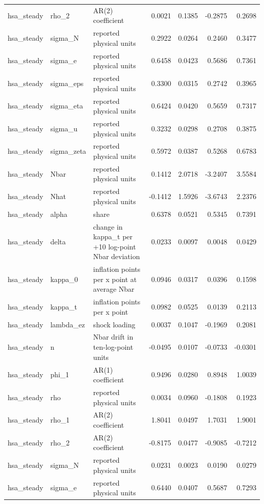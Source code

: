 \begin{tabular}{lllrrrr}
hsa\_steady & rho\_2 & AR(2) coefficient & 0.0021 & 0.1385 & -0.2875 & 0.2698 \\
hsa\_steady & sigma\_N & reported physical units & 0.2922 & 0.0264 & 0.2460 & 0.3477 \\
hsa\_steady & sigma\_e & reported physical units & 0.6458 & 0.0423 & 0.5686 & 0.7361 \\
hsa\_steady & sigma\_eps & reported physical units & 0.3300 & 0.0315 & 0.2742 & 0.3965 \\
hsa\_steady & sigma\_eta & reported physical units & 0.6424 & 0.0420 & 0.5659 & 0.7317 \\
hsa\_steady & sigma\_u & reported physical units & 0.3232 & 0.0298 & 0.2708 & 0.3875 \\
hsa\_steady & sigma\_zeta & reported physical units & 0.5972 & 0.0387 & 0.5268 & 0.6783 \\
hsa\_steady & Nbar & reported physical units & 0.1412 & 2.0718 & -3.2407 & 3.5584 \\
hsa\_steady & Nhat & reported physical units & -0.1412 & 1.5926 & -3.6743 & 2.2376 \\
hsa\_steady & alpha & share & 0.6378 & 0.0521 & 0.5345 & 0.7391 \\
hsa\_steady & delta & change in kappa\_t per +10 log-point Nbar deviation & 0.0233 & 0.0097 & 0.0048 & 0.0429 \\
hsa\_steady & kappa\_0 & inflation points per x point at average Nbar & 0.0946 & 0.0317 & 0.0396 & 0.1598 \\
hsa\_steady & kappa\_t & inflation points per x point & 0.0982 & 0.0525 & 0.0139 & 0.2113 \\
hsa\_steady & lambda\_ez & shock loading & 0.0037 & 0.1047 & -0.1969 & 0.2081 \\
hsa\_steady & n & Nbar drift in ten-log-point units & -0.0495 & 0.0107 & -0.0733 & -0.0301 \\
hsa\_steady & phi\_1 & AR(1) coefficient & 0.9496 & 0.0280 & 0.8948 & 1.0039 \\
hsa\_steady & rho & reported physical units & 0.0034 & 0.0960 & -0.1808 & 0.1923 \\
hsa\_steady & rho\_1 & AR(2) coefficient & 1.8041 & 0.0497 & 1.7031 & 1.9001 \\
hsa\_steady & rho\_2 & AR(2) coefficient & -0.8175 & 0.0477 & -0.9085 & -0.7212 \\
hsa\_steady & sigma\_N & reported physical units & 0.0231 & 0.0023 & 0.0190 & 0.0279 \\
hsa\_steady & sigma\_e & reported physical units & 0.6440 & 0.0407 & 0.5687 & 0.7293 \\

\end{tabular}
